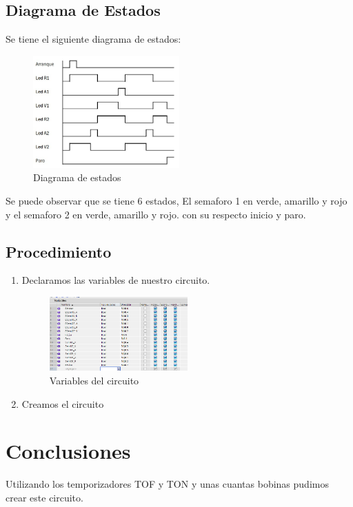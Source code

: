 \documentclass[12pt]{report}
\begin{document}
\section{Diagrama de Estados}
  Se tiene el siguiente diagrama de estados:
  \begin{figure}[H]
    \centering
    \includegraphics[width=0.5\textwidth]{screenshots/diagrama.jpg}
    \caption{Diagrama de estados}
    \label{fig:estados}
  \end{figure}
  Se puede observar que se tiene 6 estados, El semaforo 1 en verde, amarillo y rojo y el semaforo 2 en verde, amarillo y rojo. con su respecto inicio y paro.
\section{Procedimiento}
\begin{enumerate}
  \item Declaramos las variables de nuestro circuito.
    \begin{figure}[H]
      \centering
      \includegraphics[width=0.5\textwidth]{screenshots/Variables.png}
      \caption{Variables del circuito}
      \label{fig:variables}
    \end{figure}
  \item Creamos el circuito


\end{enumerate}

\newpage

\newpage

\chapter{Conclusiones}
  Utilizando los temporizadores TOF y TON y unas cuantas bobinas pudimos crear este circuito.
\newpage
\end{document}
